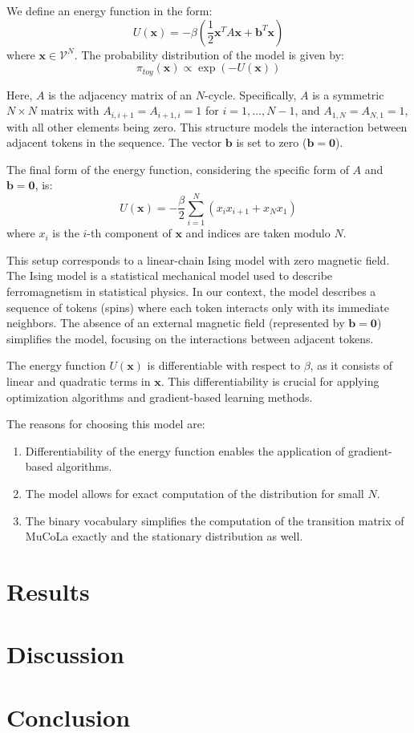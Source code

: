 \documentclass{article}
\begin{document}
We define an energy function in the form: 
\[ U(\boldsymbol{x}) = - \beta \left(\frac{1}{2}\boldsymbol{x}^T A \boldsymbol{x} + \boldsymbol{b}^T \boldsymbol{x}\right) \]
where \(\boldsymbol{x} \in \mathcal{V}^N\). The probability distribution of the model is given by:
\[ \pi_{toy}(\boldsymbol{x}) \propto \exp(-U(\boldsymbol{x})) \]

Here, \(A\) is the adjacency matrix of an \(N\)-cycle. Specifically, \(A\) is a symmetric \(N \times N\) matrix with \(A_{i,i+1} = A_{i+1,i} = 1\) for \(i = 1, \ldots, N-1\), and \(A_{1,N} = A_{N,1} = 1\), with all other elements being zero. This structure models the interaction between adjacent tokens in the sequence. The vector \(\boldsymbol{b}\) is set to zero (\(\boldsymbol{b} = \boldsymbol{0}\)).

The final form of the energy function, considering the specific form of \(A\) and \(\boldsymbol{b} = \boldsymbol{0}\), is:
\[ U(\boldsymbol{x}) = - \frac{\beta}{2} \sum_{i=1}^{N} (x_i x_{i+1} + x_{N} x_{1}) \]
where \(x_i\) is the \(i\)-th component of \(\boldsymbol{x}\) and indices are taken modulo \(N\).

This setup corresponds to a linear-chain Ising model with zero magnetic field. The Ising model is a statistical mechanical model used to describe ferromagnetism in statistical physics. In our context, the model describes a sequence of tokens (spins) where each token interacts only with its immediate neighbors. The absence of an external magnetic field (represented by \(\boldsymbol{b} = \boldsymbol{0}\)) simplifies the model, focusing on the interactions between adjacent tokens.

The energy function \(U(\boldsymbol{x})\) is differentiable with respect to \(\beta\), as it consists of linear and quadratic terms in \(\boldsymbol{x}\). This differentiability is crucial for applying optimization algorithms and gradient-based learning methods.

The reasons for choosing this model are:
\begin{enumerate}
    \item Differentiability of the energy function enables the application of gradient-based algorithms.
    \item The model allows for exact computation of the distribution for small \(N\).
    \item The binary vocabulary simplifies the computation of the transition matrix of MuCoLa exactly and the stationary distribution as well.
\end{enumerate}

\section{Results}


\section{Discussion}


\section{Conclusion}





\end{document}
